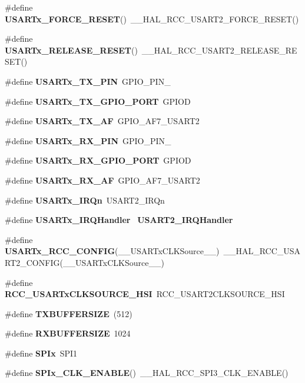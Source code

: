 \begin{DoxyCompactItemize}
\#define \textbf{ U\+S\+A\+R\+Tx\+\_\+\+F\+O\+R\+C\+E\+\_\+\+R\+E\+S\+ET}()~\+\_\+\+\_\+\+H\+A\+L\+\_\+\+R\+C\+C\+\_\+\+U\+S\+A\+R\+T2\+\_\+\+F\+O\+R\+C\+E\+\_\+\+R\+E\+S\+ET()
\item 
\#define \textbf{ U\+S\+A\+R\+Tx\+\_\+\+R\+E\+L\+E\+A\+S\+E\+\_\+\+R\+E\+S\+ET}()~\+\_\+\+\_\+\+H\+A\+L\+\_\+\+R\+C\+C\+\_\+\+U\+S\+A\+R\+T2\+\_\+\+R\+E\+L\+E\+A\+S\+E\+\_\+\+R\+E\+S\+ET()
\item 
\#define \textbf{ U\+S\+A\+R\+Tx\+\_\+\+T\+X\+\_\+\+P\+IN}~G\+P\+I\+O\+\_\+\+P\+I\+N\+\_
\item 
\#define \textbf{ U\+S\+A\+R\+Tx\+\_\+\+T\+X\+\_\+\+G\+P\+I\+O\+\_\+\+P\+O\+RT}~G\+P\+I\+OD
\item 
\#define \textbf{ U\+S\+A\+R\+Tx\+\_\+\+T\+X\+\_\+\+AF}~G\+P\+I\+O\+\_\+\+A\+F7\+\_\+\+U\+S\+A\+R\+T2
\item 
\#define \textbf{ U\+S\+A\+R\+Tx\+\_\+\+R\+X\+\_\+\+P\+IN}~G\+P\+I\+O\+\_\+\+P\+I\+N\+\_
\item 
\#define \textbf{ U\+S\+A\+R\+Tx\+\_\+\+R\+X\+\_\+\+G\+P\+I\+O\+\_\+\+P\+O\+RT}~G\+P\+I\+OD
\item 
\#define \textbf{ U\+S\+A\+R\+Tx\+\_\+\+R\+X\+\_\+\+AF}~G\+P\+I\+O\+\_\+\+A\+F7\+\_\+\+U\+S\+A\+R\+T2
\item 
\#define \textbf{ U\+S\+A\+R\+Tx\+\_\+\+I\+R\+Qn}~U\+S\+A\+R\+T2\+\_\+\+I\+R\+Qn
\item 
\#define \textbf{ U\+S\+A\+R\+Tx\+\_\+\+I\+R\+Q\+Handler}~\textbf{ U\+S\+A\+R\+T2\+\_\+\+I\+R\+Q\+Handler}
\item 
\#define \textbf{ U\+S\+A\+R\+Tx\+\_\+\+R\+C\+C\+\_\+\+C\+O\+N\+F\+IG}(\+\_\+\+\_\+\+U\+S\+A\+R\+Tx\+C\+L\+K\+Source\+\_\+\+\_\+)~\+\_\+\+\_\+\+H\+A\+L\+\_\+\+R\+C\+C\+\_\+\+U\+S\+A\+R\+T2\+\_\+\+C\+O\+N\+F\+IG(\+\_\+\+\_\+\+U\+S\+A\+R\+Tx\+C\+L\+K\+Source\+\_\+\+\_\+)
\item 
\#define \textbf{ R\+C\+C\+\_\+\+U\+S\+A\+R\+Tx\+C\+L\+K\+S\+O\+U\+R\+C\+E\+\_\+\+H\+SI}~R\+C\+C\+\_\+\+U\+S\+A\+R\+T2\+C\+L\+K\+S\+O\+U\+R\+C\+E\+\_\+\+H\+SI
\item 
\#define \textbf{ T\+X\+B\+U\+F\+F\+E\+R\+S\+I\+ZE}~(512)
\item 
\#define \textbf{ R\+X\+B\+U\+F\+F\+E\+R\+S\+I\+ZE}~1024
\item 
\#define \textbf{ S\+P\+Ix}~S\+P\+I1
\item 
\#define \textbf{ S\+P\+Ix\+\_\+\+C\+L\+K\+\_\+\+E\+N\+A\+B\+LE}()~\+\_\+\+\_\+\+H\+A\+L\+\_\+\+R\+C\+C\+\_\+\+S\+P\+I3\+\_\+\+C\+L\+K\+\_\+\+E\+N\+A\+B\+LE()
\item 

\end{DoxyCompactItemize}
